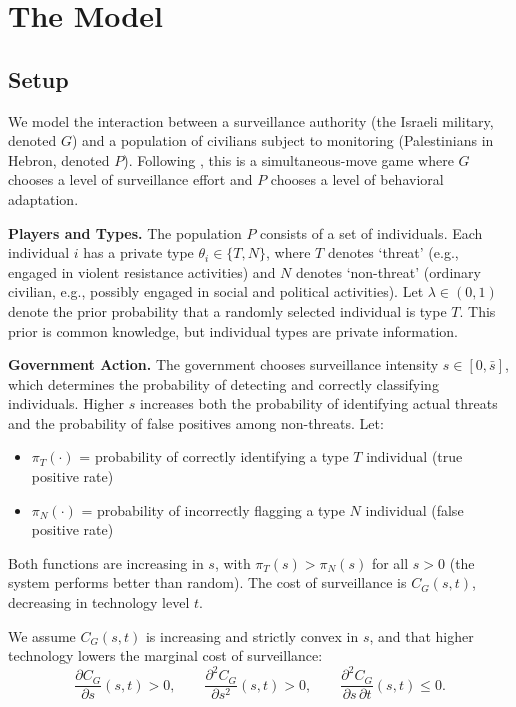 \documentclass[11pt,a4paper]{article}
\theoremstyle{definition}
\theoremstyle{remark}
\theoremstyle{definition}
\begin{document}
\section{The Model}

\subsection{Setup}

We model the interaction between a surveillance authority (the Israeli military, denoted $G$) and a population of civilians subject to 
monitoring (Palestinians in Hebron, denoted $P$). Following \citet{dragu2021digital}, this is a simultaneous-move game where $G$ chooses a 
level of surveillance effort and $P$ chooses a level of behavioral adaptation.

\textbf{Players and Types.} The population $P$ consists of a set of individuals. Each individual $i$ has a private type 
$\theta_i \in \{T, N\}$, where $T$ denotes `threat' (e.g., engaged in violent resistance activities) and $N$ denotes `non-threat' 
(ordinary civilian, e.g., possibly engaged in social and political activities). Let $\lambda \in (0,1)$ denote the prior probability that a 
randomly selected individual is type $T$. This prior is common knowledge, but individual types are private information.

\textbf{Government Action.} The government chooses surveillance intensity $s \in [0, \bar{s}]$, which determines the probability of detecting 
and correctly classifying individuals. Higher $s$ increases both the probability of identifying actual threats and the probability of false 
positives among non-threats. Let:
\begin{itemize}[nosep]
    \item $\pi_T(\cdot)$ = probability of correctly identifying a type $T$ individual (true positive rate)
    \item $\pi_N(\cdot)$ = probability of incorrectly flagging a type $N$ individual (false positive rate)    
\end{itemize}
Both functions are increasing in $s$, with $\pi_T(s) > \pi_N(s)$ for all $s > 0$ (the system performs better than random). The cost of 
surveillance is $C_G(s,t)$, decreasing in technology level $t$.

We assume $C_G(s,t)$ is increasing and strictly convex in $s$, and that higher technology lowers the marginal cost of surveillance:
$$
\frac{\partial C_G}{\partial s}(s,t) > 0,
\qquad
\frac{\partial^2 C_G}{\partial s^2}(s,t) > 0,
\qquad
\frac{\partial^2 C_G}{\partial s\,\partial t}(s,t)\le 0.
$$
\end{document}
